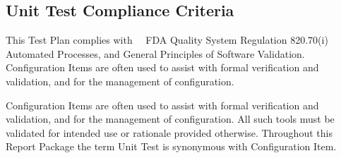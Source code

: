 \subsection{Unit Test Compliance Criteria}
This Test Plan complies with \sopSDLC\, \sopSCM\, FDA Quality System Regulation
820.70(i) Automated Processes, and General Principles of Software Validation.
Configuration Items are often used to assist with formal verification and
validation, and for the management of configuration.

Configuration Items are often used to assist with formal verification and
validation, and for the management of configuration.  All such tools must be
validated for intended use or rationale provided otherwise.  Throughout this
Report Package the term Unit Test is synonymous with Configuration Item.
